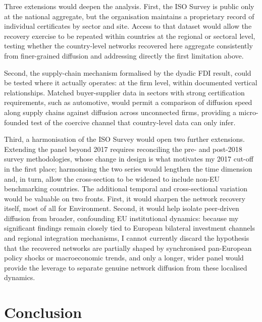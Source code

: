 \documentclass[12pt,a4paper]{article}
\begin{document}
Three extensions would deepen the analysis. First, the ISO Survey is public only at the national aggregate, but the organisation maintains a proprietary record of individual certificates by sector and site. Access to that dataset would allow the recovery exercise to be repeated within countries at the regional or sectoral level, testing whether the country-level networks recovered here aggregate consistently from finer-grained diffusion and addressing directly the first limitation above.

Second, the supply-chain mechanism formalised by the dyadic FDI result, could be tested where it actually operates: at the firm level, within documented vertical relationships. Matched buyer-supplier data in sectors with strong certification requirements, such as automotive, would permit a comparison of diffusion speed along supply chains against diffusion across unconnected firms, providing a micro-founded test of the coercive channel that country-level data can only infer.

Third, a harmonisation of the ISO Survey would open two further extensions. Extending the panel beyond 2017 requires reconciling the pre- and post-2018 survey methodologies, whose change in design is what motivates my 2017 cut-off in the first place; harmonising the two series would lengthen the time dimension and, in turn, allow the cross-section to be widened to include non-EU benchmarking countries. The additional temporal and cross-sectional variation would be valuable on two fronts. First, it would sharpen the network recovery itself, most of all for Environment. Second, it would help isolate peer-driven diffusion from broader, confounding EU institutional dynamics: because my significant findings remain closely tied to European bilateral investment channels and regional integration mechanisms, I cannot currently discard the hypothesis that the recovered networks are partially shaped by synchronised pan-European policy shocks or macroeconomic trends, and only a longer, wider panel would provide the leverage to separate genuine network diffusion from these localised dynamics.

\clearpage
\section{Conclusion}
\label{sec:conclusion}
\end{document}
